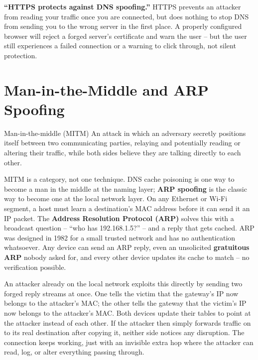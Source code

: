 \begin{misconception}
\textbf{``HTTPS protects against DNS spoofing.''} HTTPS prevents an attacker from reading your
traffic once you are connected, but does nothing to stop DNS from sending you to the wrong server
in the first place. A properly configured browser will reject a forged server's certificate and
warn the user -- but the user still experiences a failed connection or a warning to click through,
not silent protection.
\end{misconception}

\section{Man-in-the-Middle and ARP Spoofing}

\begin{definition}{Man-in-the-middle (MITM)}
An attack in which an adversary secretly positions itself between two communicating parties,
relaying and potentially reading or altering their traffic, while both sides believe they are
talking directly to each other.
\end{definition}

MITM is a category, not one technique. DNS cache poisoning is one way to become a man in the
middle at the naming layer; \textbf{ARP spoofing} is the classic way to become one at the local
network layer. On any Ethernet or Wi-Fi segment, a host must learn a destination's MAC address
before it can send it an IP packet. The \textbf{Address Resolution Protocol (ARP)} solves this
with a broadcast question -- ``who has 192.168.1.5?'' -- and a reply that gets cached. ARP was
designed in 1982 for a small trusted network and has no authentication
whatsoever. Any device can send an ARP reply, even an unsolicited
\textbf{gratuitous ARP} nobody asked for, and every other device updates its cache to match -- no
verification possible.

An attacker already on the local network exploits this directly by sending two forged reply
streams at once. One tells the victim that the gateway's IP now belongs to the attacker's MAC; the
other tells the gateway that the victim's IP now belongs to the attacker's MAC. Both devices update
their tables to point at the attacker instead of each other. If the attacker then simply forwards
traffic on to its real destination after copying it, neither side notices any disruption. The
connection keeps working, just with an invisible extra hop where the attacker can read, log, or
alter everything passing through.

